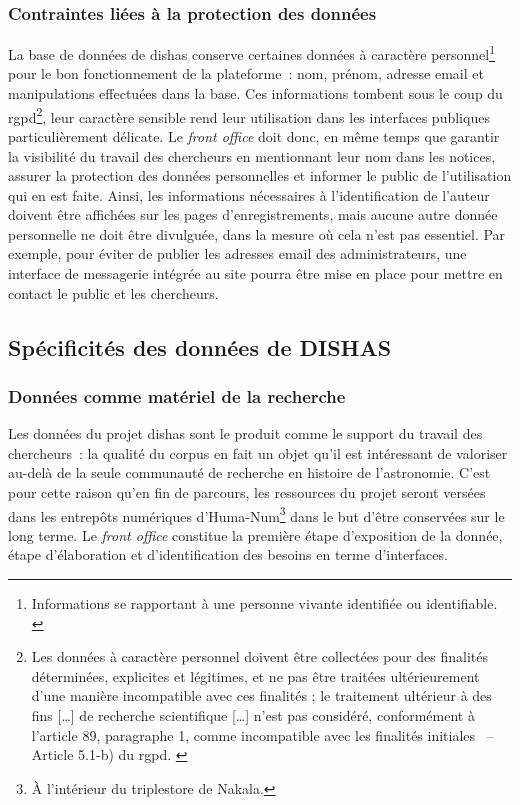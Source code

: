 \documentclass[a4paper,12pt,twoside]{book}
\newcommand{\eng}{\emph}
\newcommand{\p}{[\ldots]\xspace}
\newcommand{\bdd}{base de données\xspace}
\newcommand{\g}[1]{\og#1~\fg}
\newcommand{\dishas}{\gls{dishas}\xspace}
\newcommand{\rgpd}{\gls{rgpd}\xspace}
\begin{document}
			\subsubsection{Contraintes liées à la protection des données}
La \bdd de \dishas conserve certaines données à caractère personnel\footnote{Informations se rapportant à une personne vivante identifiée ou identifiable. \cite{ReglementUE2016}} pour le bon fonctionnement de la plateforme~: nom, prénom, adresse email et manipulations effectuées dans la base. Ces informations tombent sous le coup du \rgpd\footnote{Les données à caractère personnel doivent être \g{collectées pour des finalités déterminées, explicites et légitimes, et ne pas être traitées ultérieurement d'une manière incompatible avec ces finalités ; le traitement ultérieur à des fins \p de recherche scientifique \p n'est pas considéré, conformément à l'article 89, paragraphe 1, comme incompatible avec les finalités initiales} – Article 5.1-b) du \rgpd. \cite{ReglementUE2016}}, leur caractère sensible rend leur utilisation dans les interfaces publiques particulièrement délicate. Le \eng{front office} doit donc, en même temps que garantir la visibilité du travail des chercheurs en mentionnant leur nom dans les notices, assurer la protection des données personnelles et informer le public de l'utilisation qui en est faite. Ainsi, les informations nécessaires à l'identification de l'auteur doivent être affichées sur les pages d'enregistrements, mais aucune autre donnée personnelle ne doit être divulguée, dans la mesure où cela n'est pas essentiel. Par exemple, pour éviter de publier les adresses email des administrateurs, une interface de messagerie intégrée au site pourra être mise en place pour mettre en contact le public et les chercheurs.

		\subsection{Spécificités des données de DISHAS}
			\subsubsection{Données comme matériel de la recherche}
Les données du projet \dishas sont le produit comme le support du travail des chercheurs~: la qualité du corpus en fait un objet qu'il est intéressant de valoriser au-delà de la seule communauté de recherche en histoire de l'astronomie. C'est pour cette raison qu'en fin de parcours, les ressources du projet seront versées dans les entrepôts numériques d'Huma-Num\footnote{À l'intérieur du triplestore de Nakala.} dans le but d'être conservées sur le long terme. Le \eng{front office} constitue la première étape d'exposition de la donnée, étape d'élaboration et d'identification des besoins en terme d'interfaces.
\end{document}
